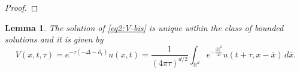 \documentclass[11pt, twoside, notitlepage]{amsart}
\newtheorem{lemma}[theorem]{Lemma}
\newcommand\R{\mathbb{R}}
\numberwithin{equation}{section}
\begin{document}
\begin{proof}
\end{proof}



\begin{lemma}\label{Lemma:V}
 The solution of \eqref{eq2:V-bis}
is unique within the class of bounded solutions and it is given by
\begin{equation*}%
   V(x,t,\tau)=e^{-\tau (-\Delta -\partial_t)}u(x,t)=\frac{1}{(4\pi\tau)^{d/2}}  \int_{\R^d} e^{-\frac{|\overline{x}|^2}{4\tau}} u(t+\tau, x- \overline{x}) \, d \overline{x}.
   \end{equation*}
\end{lemma}
\end{document}
